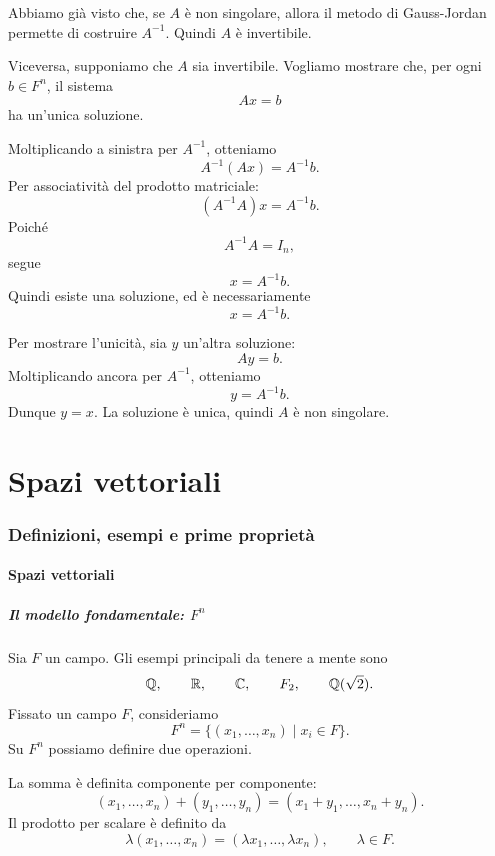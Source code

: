 \documentclass[a4paper]{article}
\begin{document}
\begin{snippetproof}{}
    Abbiamo già visto che, se \(A\) è non singolare, allora il metodo di Gauss-Jordan permette di costruire \(A^{-1}\). Quindi \(A\) è invertibile.

    Viceversa, supponiamo che \(A\) sia invertibile. Vogliamo mostrare che, per ogni \(b\in F^n\), il sistema
    \[
        Ax=b
    \]
    ha un'unica soluzione.

    Moltiplicando a sinistra per \(A^{-1}\), otteniamo
    \[
        A^{-1}(Ax)=A^{-1}b.
    \]
    Per associatività del prodotto matriciale:
    \[
        (A^{-1}A)x=A^{-1}b.
    \]
    Poiché
    \[
        A^{-1}A=I_n,
    \]
    segue
    \[
        x=A^{-1}b.
    \]
    Quindi esiste una soluzione, ed è necessariamente
    \[
        x=A^{-1}b.
    \]

    Per mostrare l'unicità, sia \(y\) un'altra soluzione:
    \[
        Ay=b.
    \]
    Moltiplicando ancora per \(A^{-1}\), otteniamo
    \[
        y=A^{-1}b.
    \]
    Dunque \(y=x\). La soluzione è unica, quindi \(A\) è non singolare.
\end{snippetproof}

\part{Spazi vettoriali}

\section{Definizioni, esempi e prime proprietà}

\subsection{Spazi vettoriali}

\subsubsection{Il modello fondamentale: \texorpdfstring{\(F^n\)}{Fn}}

Sia \(F\) un campo. Gli esempi principali da tenere a mente sono
\[
    \mathbb{Q},
    \qquad
    \mathbb{R},
    \qquad
    \mathbb{C},
    \qquad
    F_2,
    \qquad
    \mathbb{Q}(\sqrt{2}).
\]
Fissato un campo \(F\), consideriamo
\[
    F^n=\{(x_1,\ldots,x_n)\mid x_i\in F\}.
\]
Su \(F^n\) possiamo definire due operazioni.

La somma è definita componente per componente:
\[
    (x_1,\ldots,x_n)+(y_1,\ldots,y_n)
    =
    (x_1+y_1,\ldots,x_n+y_n).
\]
Il prodotto per scalare è definito da
\[
    \lambda(x_1,\ldots,x_n)
    =
    (\lambda x_1,\ldots,\lambda x_n),
    \qquad
    \lambda\in F.
\]
\end{document}
